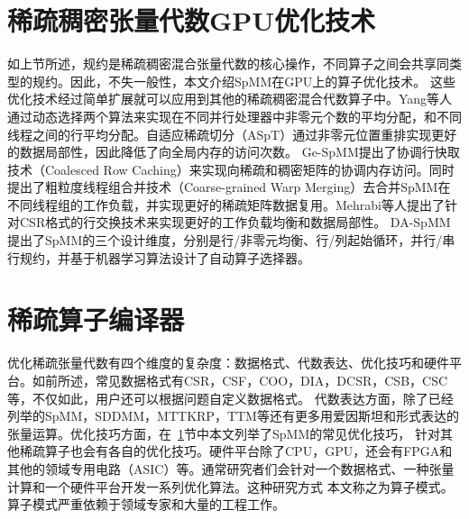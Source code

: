 \section{稀疏稠密张量代数GPU优化技术}\label{sec:spmmopt}
如上节所述，规约是稀疏稠密混合张量代数的核心操作，不同算子之间会共享同类型的规约。因此，不失一般性，本文介绍SpMM在GPU上的算子优化技术。
这些优化技术经过简单扩展就可以应用到其他的稀疏稠密混合代数算子中。Yang等人\cite{yang2018design}通过动态选择两个算法来实现在不同并行处理器中非零元个数的平均分配，和不同线程之间的行平均分配。自适应稀疏切分（ASpT）\cite{hong2019adaptive}通过非零元位置重排实现更好的数据局部性，因此降低了向全局内存的访问次数。
Ge-SpMM\cite{huang2020ge}提出了协调行快取技术（Coalesced Row Caching）来实现向稀疏和稠密矩阵的协调内存访问。同时提出了粗粒度线程组合并技术（Coarse-grained Warp Merging）去合并SpMM在不同线程组的工作负载，并实现更好的稀疏矩阵数据复用。Mehrabi等人\cite{mehrabi2021learning}提出了针对CSR格式的行交换技术来实现更好的工作负载均衡和数据局部性。
DA-SpMM\cite{dai2022heuristic}提出了SpMM的三个设计维度，分别是行/非零元均衡、行/列起始循环，并行/串行规约，并基于机器学习算法设计了自动算子选择器。

\section{稀疏算子编译器}\label{sec:spcomp}
优化稀疏张量代数有四个维度的复杂度：数据格式、代数表达、优化技巧和硬件平台。如前所述，常见数据格式有CSR，CSF，COO，DIA，DCSR，CSB，CSC等，不仅如此，用户还可以根据问题自定义数据格式。
代数表达方面，除了已经列举的SpMM，SDDMM，MTTKRP，TTM等还有更多用爱因斯坦和\cite{einsteinsum}形式表达的张量运算。优化技巧方面，在~\ref{sec:spmmopt}节中本文列举了SpMM的常见优化技巧，
针对其他稀疏算子也会有各自的优化技巧。硬件平台除了CPU，GPU，还会有FPGA和其他的领域专用电路（ASIC）等。通常研究者们会针对一个数据格式、一种张量计算和一个硬件平台开发一系列优化算法。这种研究方式
本文称之为算子模式。算子模式严重依赖于领域专家和大量的工程工作\cite{wang2014mkl,naumov2010cusparse,guennebaud2010eigen}。


